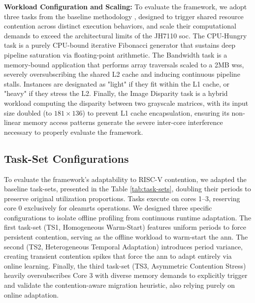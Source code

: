 \documentclass[journal]{IEEEtran}
\begin{document}
\textbf{Workload Configuration and Scaling:} To evaluate the framework, we adopt three tasks from the baseline methodology \cite{hoffmann2021online}, designed to trigger shared resource contention across distinct execution behaviors, and scale their computational demands to exceed the architectural limits of the JH7110 \gls{soc}. The CPU-Hungry task is a purely CPU-bound iterative Fibonacci generator that sustains deep pipeline saturation via floating-point arithmetic. The Bandwidth task is a memory-bound application that performs array traversals scaled to a 2MB \gls{wss}, severely oversubscribing the shared L2 cache and inducing continuous pipeline stalls. Instances are designated as "light" if they fit within the L1 cache, or "heavy" if they stress the L2. Finally, the Image Disparity task is a hybrid workload computing the disparity between two grayscale matrices, with its input size doubled (to $181\times136$) to prevent L1 cache encapsulation, ensuring its non-linear memory access patterns generate the severe inter-core interference necessary to properly evaluate the framework.

\subsection{Task-Set Configurations} \label{sec:task-sets}

To evaluate the framework's adaptability to RISC-V contention, we adapted the baseline task-sets, presented in the Table \ref{tab:task-sets}, doubling their periods to preserve original utilization proportions. Tasks execute on cores 1–3, reserving core 0 exclusively for \gls{oleamrts} operations. We designed three specific configurations to isolate offline profiling from continuous runtime adaptation. The first task-set (TS1, Homogeneous Warm-Start) features uniform periods to force persistent contention, serving as the offline workload to warm-start the \gls{ann}. The second (TS2, Heterogeneous Temporal Adaptation) introduces period variance, creating transient contention spikes that force the \gls{ann} to adapt entirely via online learning. Finally, the third task-set (TS3, Asymmetric Contention Stress) heavily oversubscribes Core 3 with diverse memory demands to explicitly trigger and validate the contention-aware migration heuristic, also relying purely on online adaptation.
\end{document}
